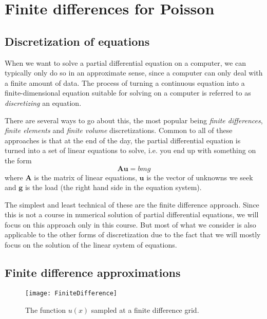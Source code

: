 \newcommand{\ub}[1]{{bm #1}}

\chapter{Finite differences for Poisson}

\section{Discretization of equations}

When we want to solve a partial differential equation on a computer, we can
typically only do so in an approximate sense, since a computer can only deal
with a finite amount of data. The process of turning a continuous equation into
a finite-dimensional equation suitable for solving on a computer is referred to
as \emph{discretizing} an equation.

There are several ways to go about this, the most popular being \emph{finite
differences}, \emph{finite elements} and \emph{finite volume} discretizations.
Common to all of these approaches is that at the end of the day, the partial
differential equation is turned into a set of linear equations to solve, i.e.
you end up with something on the form
\[
  \bm A \bm u = bm g
\]
where $\bm A$ is the matrix of linear equations, $\bm u$ is the vector of
unknowns we seek and $\bm g$ is the load (the right hand side in the equation
system).

The simplest and least technical of these are the finite difference approach.
Since this is not a course in numerical solution of partial differential
equations, we will focus on this approach only in this course. But most of what
we consider is also applicable to the other forms of discretization due to the
fact that we will mostly focus on the solution of the linear system of
equations.

\section{Finite difference approximations}

\begin{figure}
  \centering
  \texttt{[image: FiniteDifference]}
  \caption{The function $u(x)$ sampled at a finite difference grid.}
  \label{fig:FiniteDifference}
\end{figure}

